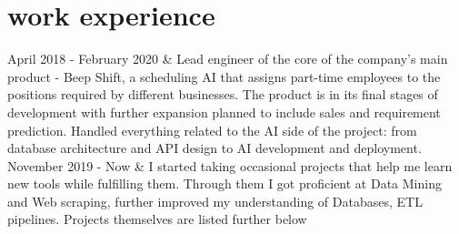 \documentclass[]{cv-roald}
\begin{document}
\section*{work experience}
\begin{tabularcv}
   April 2018 - February 2020       &   
                    \newline Lead engineer of the core of the company's main product - Beep Shift, a scheduling AI that assigns part-time employees to the positions required by different businesses. The product is in its final stages of development with further expansion planned to include sales and requirement prediction.
                    \newline Handled everything related to the AI side of the project: from database architecture and API design to AI development and deployment.
                    \\[\vspacepar]
  November 2019 - Now   & 
                    \newline I started taking occasional projects that help me learn new tools while fulfilling them. Through them I got proficient at Data Mining and Web scraping, further improved my understanding of Databases, ETL pipelines. Projects themselves are listed further below

\end{tabularcv}
\end{document}
